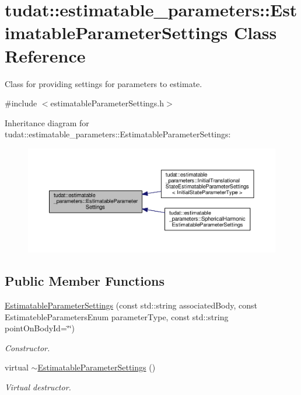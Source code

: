 \hypertarget{classtudat_1_1estimatable__parameters_1_1EstimatableParameterSettings}{}\section{tudat\+:\+:estimatable\+\_\+parameters\+:\+:Estimatable\+Parameter\+Settings Class Reference}
\label{classtudat_1_1estimatable__parameters_1_1EstimatableParameterSettings}


Class for providing settings for parameters to estimate.  




{\ttfamily \#include $<$estimatable\+Parameter\+Settings.\+h$>$}



Inheritance diagram for tudat\+:\+:estimatable\+\_\+parameters\+:\+:Estimatable\+Parameter\+Settings\+:
\nopagebreak
\begin{figure}[H]
\begin{center}
\leavevmode
\includegraphics[width=350pt]{classtudat_1_1estimatable__parameters_1_1EstimatableParameterSettings__inherit__graph}
\end{center}
\end{figure}
\subsection*{Public Member Functions}
\begin{DoxyCompactItemize}
\item 
\hyperlink{classtudat_1_1estimatable__parameters_1_1EstimatableParameterSettings_a9daf25d39f47b7253d0705460760c79c}{Estimatable\+Parameter\+Settings} (const std\+::string associated\+Body, const Estimateble\+Parameters\+Enum parameter\+Type, const std\+::string point\+On\+Body\+Id=\char`\"{}\char`\"{})
\begin{DoxyCompactList}\small\item\em Constructor. \end{DoxyCompactList}\item 
virtual \hyperlink{classtudat_1_1estimatable__parameters_1_1EstimatableParameterSettings_a337ccc9c7a09be382677b818d3042082}{$\sim$\+Estimatable\+Parameter\+Settings} ()
\begin{DoxyCompactList}\small\item\em Virtual destructor. \end{DoxyCompactList}\end{DoxyCompactItemize}
